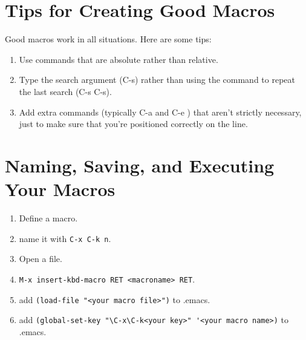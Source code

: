 \section{Tips for Creating Good Macros}

Good macros work in all situations.
Here are some tips:
\begin{enumerate}
\item Use commands that are absolute rather than relative.
\item Type the search argument (C-s) rather than using the command to repeat the last search (C-s C-s).
\item Add extra commands (typically C-a and C-e ) that aren't strictly necessary, just to make sure that you're positioned correctly on the line.
\end{enumerate}



\section{Naming, Saving, and Executing Your Macros}

\begin{enumerate}
\item Define a macro.
\item name it with \verb|C-x C-k n|.
\item Open a file.
\item \verb|M-x insert-kbd-macro RET <macroname> RET|.
\item add \verb|(load-file "<your macro file>")| to .emacs.
\item add \verb|(global-set-key "\C-x\C-k<your key>" '<your macro name>)| to .emacs.
\end{enumerate}

